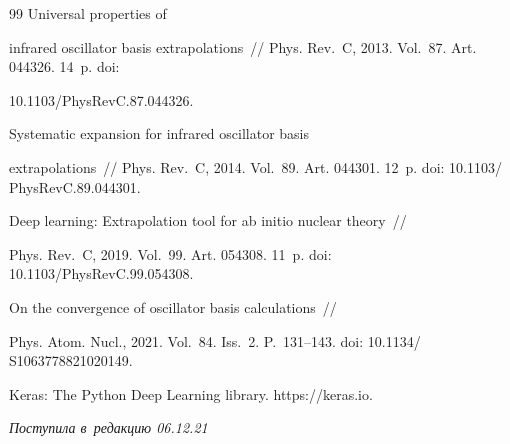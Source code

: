 {{\begin{thebibliography}{99}
 Universal properties of 


infrared oscillator basis extrapolations~/\!\!/ Phys. Rev.~C, 2013. Vol.~87. Art. 044326. 14~p. doi: 


10.1103\!/\!PhysRevC.87.044326.







 Systematic expansion for infrared oscillator basis 


extrapolations~/\!\!/ Phys. Rev.~C, 2014.  Vol.~89. Art. 044301. 12~p. doi: 10.1103\!/ PhysRevC.89.044301. 







 Deep learning: Extrapolation tool for ab initio nuclear theory~/\!\!/ 


Phys. Rev.~C, 2019. Vol.~99. Art. 054308. 11~p. doi: 10.1103\!/\!PhysRevC.99.054308. 




 On the convergence of oscillator basis calculations~/\!\!/ 


Phys. Atom. Nucl., 2021. Vol.~84. Iss.~2. P.~131--143. doi: 10.1134\!/ S1063778821020149.




Keras: The Python Deep Learning library. {\sf https://keras.io}.


       \end{thebibliography}


} }











\vspace*{-3pt}





\hfill{\small\textit{Поступила в~редакцию 06.12.21}}





\vspace*{8pt}





